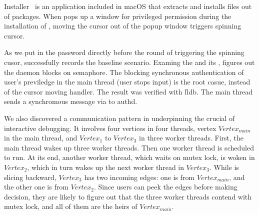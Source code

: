 Installer~\cite{Installer} is an application included in macOS that extracts and installs
files out of  packages. When  pops up a window for
privileged permission during the installation of ,
moving the cursor out of the popup window triggers spinning cursor.

As we put in the password directly before the round of triggering the
spinning cusor, \xxx successfully records the baseline scenario. Examing
the \spinningnode and its \similarnode, \xxx figures out the daemon
 blocks on semaphore. The blocking synchronous authentication
of user's previledge in the main thread (user stops input) is the root
casue, instead of the cursor moving handler. The result was verified with
\v{lldb}. The main thread sends a synchromous message via  to authd.


We also discovered a communication pattern in  underpinning the
crucial of interactive debugging. It involves four vertices in four threads,
vertex $Vertex_{main}$ in the main thread, and $Vertex_1$ to $Vertex_3$ in
three worker threads. First, the main thread wakes up three worker threads.
Then one worker thread is scheduled to run. At its end, another worker thread,
which waits on mutex lock, is woken in $Vertex_2$, which in turn wakes up the
next worker thread in $Vertex_3$. While \xxx is slicing backward, $Vertex_3$
has two incoming edges: one is from $Vertex_{main}$, and the other one is from
$Vertex_2$. Since users can peek the edges before making decision, they are
likely to figure out that the three worker threads contend with mutex lock, and
all of them are the heirs of $Vertex_{main}$.
